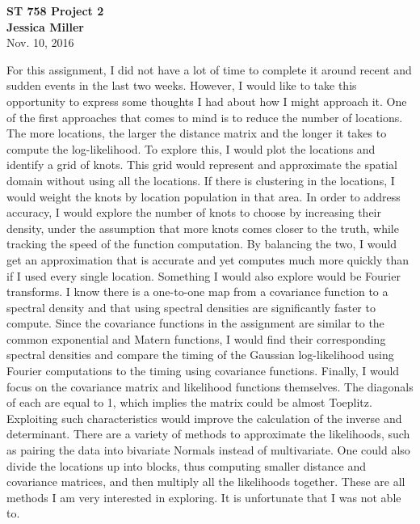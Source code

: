 \documentclass[11pt]{article}
\begin{document}
\begin{center}
	{\Large {\bf ST 758 Project 2}}\\ \vspace{12pt}
	{\large {\bf Jessica Miller}}\\ \vspace{12pt}
	Nov. 10, 2016
	\vspace{5mm}
	\vspace{5mm}
\end{center}

\begin{flushleft}
	For this assignment, I did not have a lot of time to complete it around recent and sudden events in the last two weeks. However, I would like to take this opportunity to express some thoughts I had about how I might approach it.
	\newline
	\newline
	One of the first approaches that comes to mind is to reduce the number of locations. The more locations, the larger the distance matrix and the longer it takes to compute the log-likelihood. To explore this, I would plot the locations and identify a grid of knots. This grid would represent and approximate the spatial domain without using all the locations. If there is clustering in the locations, I would weight the knots by location population in that area. In order to address accuracy, I would explore the number of knots to choose by increasing their density, under the assumption that more knots comes closer to the truth, while tracking the speed of the function computation. By balancing the two, I would get an approximation that is accurate and yet computes much more quickly than if I used every single location.
	\newline
	\newline
	Something I would also explore would be Fourier transforms. I know there is a one-to-one map from a covariance function to a spectral density and that using spectral densities are significantly faster to compute. Since the covariance functions in the assignment are similar to the common exponential and Matern functions, I would find their corresponding spectral densities and compare the timing of the Gaussian log-likelihood using Fourier computations to the timing using covariance functions.
	\newline
	\newline
	Finally, I would focus on the covariance matrix and likelihood functions themselves. The diagonals of each are equal to 1, which implies the matrix could be almost Toeplitz. Exploiting such characteristics would improve the calculation of the inverse and determinant. There are a variety of methods to approximate the likelihoods, such as pairing the data into bivariate Normals instead of multivariate. One could also divide the locations up into blocks, thus computing smaller distance and covariance matrices, and then multiply all the likelihoods together.
	\newline
	\newline
	These are all methods I am very interested in exploring. It is unfortunate that I was not able to.
\end{flushleft}
\end{document}

